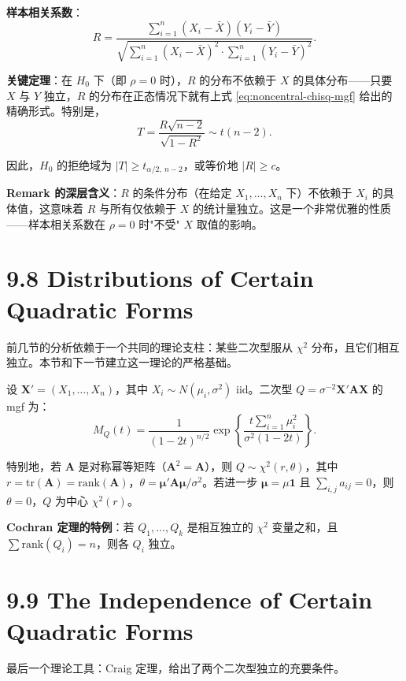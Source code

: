 \textbf{样本相关系数}：
\[
R = \frac{\sum_{i=1}^n (X_i - \bar{X})(Y_i - \bar{Y})}
{\sqrt{\sum_{i=1}^n (X_i - \bar{X})^2 \cdot \sum_{i=1}^n (Y_i - \bar{Y})^2}}.
\label{eq:sample-correlation}
\]

\textbf{关键定理}：在 $H_0$ 下（即 $\rho = 0$ 时），$R$ 的分布不依赖于 $X$ 的具体分布——只要 $X$ 与 $Y$ 独立，$R$ 的分布在正态情况下就有上式 \eqref{eq:noncentral-chisq-mgf} 给出的精确形式。特别是，
\[
T = \frac{R\sqrt{n-2}}{\sqrt{1-R^2}} \sim t(n-2).
\label{eq:correlation-t-stat}
\]

因此，$H_0$ 的拒绝域为 $|T| \geq t_{\alpha/2,\ n-2}$，或等价地 $|R| \geq c$。

\textbf{Remark 的深层含义}：$R$ 的条件分布（在给定 $X_1, \ldots, X_n$ 下）不依赖于 $X_i$ 的具体值，这意味着 $R$ 与所有仅依赖于 $X$ 的统计量独立。这是一个非常优雅的性质——样本相关系数在 $\rho = 0$ 时"不受" $X$ 取值的影响。

\section{9.8 Distributions of Certain Quadratic Forms}\label{sec:9.8}

前几节的分析依赖于一个共同的理论支柱：某些二次型服从 $\chi^2$ 分布，且它们相互独立。本节和下一节建立这一理论的严格基础。

设 $\mathbf{X}' = (X_1, \ldots, X_n)$，其中 $X_i \sim N(\mu_i, \sigma^2)$ iid。二次型 $Q = \sigma^{-2}\mathbf{X}'\mathbf{A}\mathbf{X}$ 的 mgf 为：
\[
M_Q(t) = \frac{1}{(1-2t)^{n/2}} \exp\left\{\frac{t\sum_{i=1}^n \mu_i^2}{\sigma^2(1-2t)}\right\}.
\label{eq:quadratic-form-mgf}
\]

特别地，若 $\mathbf{A}$ 是对称幂等矩阵（$\mathbf{A}^2 = \mathbf{A}$），则 $Q \sim \chi^2(r, \theta)$，其中 $r = \mathrm{tr}(\mathbf{A}) = \mathrm{rank}(\mathbf{A})$，$\theta = \boldsymbol{\mu}'\mathbf{A}\boldsymbol{\mu}/\sigma^2$。若进一步 $\boldsymbol{\mu} = \mu\mathbf{1}$ 且 $\sum_{i,j}a_{ij} = 0$，则 $\theta = 0$，$Q$ 为中心 $\chi^2(r)$。

\textbf{Cochran 定理的特例}：若 $Q_1, \ldots, Q_k$ 是相互独立的 $\chi^2$ 变量之和，且 $\sum \mathrm{rank}(Q_i) = n$，则各 $Q_i$ 独立。

\section{9.9 The Independence of Certain Quadratic Forms}\label{sec:9.9}

最后一个理论工具：Craig 定理，给出了两个二次型独立的充要条件。


